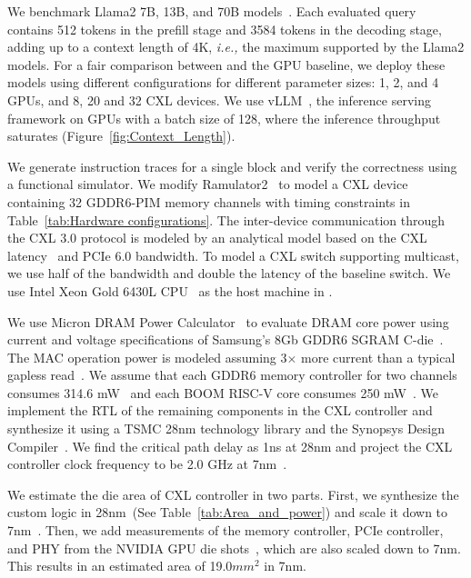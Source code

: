 We benchmark Llama2 7B, 13B, and 70B models~\cite{touvron2023llama}.
Each evaluated query contains 512 tokens in the prefill stage and 3584 tokens in the decoding stage, adding up to a context length of 4K, \textit{i.e.,} the maximum supported by the Llama2 models.
For a fair comparison between \att{} and the GPU baseline, we deploy these models using different configurations for different parameter sizes: 1, 2, and 4 GPUs, and 8, 20 and 32 CXL devices.
We use vLLM~\cite{vLLM}, the \sota{} inference serving framework on GPUs with a batch size of 128, where the inference throughput saturates (Figure~\ref{fig:Context_Length}).



We generate \att{} instruction traces for a single block and verify the correctness using a functional simulator.
We modify Ramulator2~\cite{luo2023ramulator} to model a CXL device containing 32 GDDR6-PIM memory channels with timing constraints in Table~\ref{tab:Hardware configurations}. 
The inter-device communication through the CXL 3.0 protocol is modeled by an analytical model based on the CXL latency~\cite{li2023pond} and PCIe 6.0 bandwidth. 
To model a CXL switch supporting multicast, we use half of the bandwidth and double the latency of the baseline switch. 
We use Intel Xeon Gold 6430L CPU~\cite{intelxeon} as the host machine in \att{}.

We use Micron DRAM Power Calculator~\cite{micron-power-calculator} to evaluate DRAM core power using current and voltage specifications of Samsung's 8Gb GDDR6 SGRAM C-die~\cite{samsung-8gb-gddr6}.
The MAC operation power is modeled assuming 3$\times$ more current than a typical gapless read~\cite{aim2}.
We assume that each GDDR6 memory controller for two channels consumes 314.6 mW~\cite{dram-controller-power} and each BOOM RISC-V core consumes 250 mW~\cite{boom-pdf}.
We implement the RTL of the remaining components in the CXL controller and synthesize it using a TSMC 28nm technology library and the Synopsys Design Compiler~\cite{synopsis_dc}.
We find the critical path delay as 1ns at 28nm and project the CXL controller clock frequency to be 2.0 GHz at 7nm~\cite{scaling-technology}.

We estimate the die area of CXL controller in two parts. First, we synthesize the custom logic in 28nm~(See Table~\ref{tab:Area_and_power}) and scale it down to 7nm~\cite{scaling-technology}. Then, we add measurements of the memory controller, PCIe controller, and PHY from the NVIDIA GPU die shots~\cite{TU104, A100-die-shot}, which are also scaled down to 7nm. 
This results in an estimated area of 19.0$mm^2$ in 7nm.



